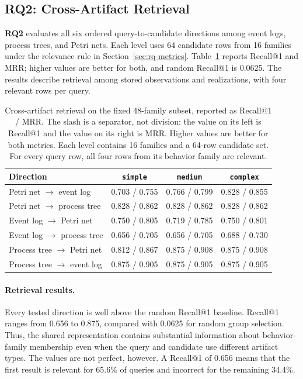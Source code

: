 \documentclass[mathematics,article,submit,moreauthors]{Definitions/mdpi}
\newcommand{\RQtwo}{\textbf{RQ2}}
\begin{document}
\FloatBarrier
\subsection{\RQtwo: Cross-Artifact Retrieval}\label{sec:retrieval-results}

\RQtwo{} evaluates all six ordered query-to-candidate directions among event logs, process trees, and Petri nets. Each level uses 64 candidate rows from 16 families under the relevance rule in Section~\ref{sec:rq-metrics}. Table~\ref{tab:retrieval} reports Recall@1 and MRR; higher values are better for both, and random Recall@1 is 0.0625. The results describe retrieval among stored observations and realizations, with four relevant rows per query.

\begin{table}[!b]
\caption{Cross-artifact retrieval on the fixed 48-family subset, reported as Recall@1 / MRR. The slash is a separator, not division: the value on its left is Recall@1 and the value on its right is MRR. Higher values are better for both metrics. Each level contains 16 families and a 64-row candidate set. For every query row, all four rows from its behavior family are relevant.\label{tab:retrieval}}
\centering
\begin{tabular}{@{}lccc@{}}
\toprule
Direction & \texttt{simple} & \texttt{medium} & \texttt{complex} \\
\midrule
Petri net $\rightarrow$ event log  & 0.703 / 0.755 & 0.766 / 0.799 & 0.828 / 0.855 \\
Petri net $\rightarrow$ process tree & 0.828 / 0.862 & 0.828 / 0.862 & 0.828 / 0.862 \\
Event log $\rightarrow$ Petri net  & 0.750 / 0.805 & 0.719 / 0.785 & 0.750 / 0.801 \\
Event log $\rightarrow$ process tree & 0.656 / 0.705 & 0.656 / 0.705 & 0.688 / 0.730 \\
Process tree $\rightarrow$ Petri net & 0.812 / 0.867 & 0.875 / 0.908 & 0.875 / 0.908 \\
Process tree $\rightarrow$ event log & 0.875 / 0.905 & 0.875 / 0.905 & 0.875 / 0.905 \\
\bottomrule
\end{tabular}
\end{table}

\paragraph{Retrieval results.}
Every tested direction is well above the random Recall@1 baseline. Recall@1 ranges from 0.656 to 0.875, compared with 0.0625 for random group selection. Thus, the shared representation contains substantial information about behavior-family membership even when the query and candidate use different artifact types. The values are not perfect, however. A Recall@1 of 0.656 means that the first result is relevant for 65.6\% of queries and incorrect for the remaining 34.4\%.
\end{document}

